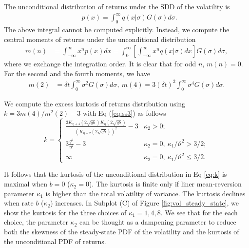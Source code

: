 \documentclass[11pt,a4paper] {article}
\begin{document}
The unconditional distribution of returns under the SDD of the volatility is
\begin{equation}
\begin{split}
& p(x) = \int^{\infty}_{0}  q(x\left.\right|\sigma) G(\sigma)d\sigma.
\end{split}
\end{equation}
The above integral cannot be computed explicitly. Instead, we compute the central moments of returns under the unconditional distribution
\begin{equation}
\begin{split}
m(n) & = \int^{\infty}_{-\infty}x^{n}p(x) dx = \int^{\infty}_{0}  \left[ \int^{\infty}_{-\infty}x^{n} q(x\left.\right|\sigma)dx\right] G(\sigma)d\sigma,
\end{split}
\end{equation}
where we exchange the integration order. It is clear that for odd $n$, $m(n)=0$. For the second and the fourth moments, we have
\begin{equation}
\begin{split}
m(2) & =  \delta t\int^{\infty}_{0} \sigma^{2} G(\sigma)d\sigma, \ m(4) =  3(\delta t)^{2}\int^{\infty}_{0} \sigma^{4} G(\sigma)d\sigma.
\end{split}
\end{equation}


We compute the excess kurtosis of returns distribution using $k=3m(4)/m^{2}(2)-3$ with Eq (\ref{eq:ss3}) as follows
\begin{equation} \label{eq:k}
k= \begin{cases} 
      \frac{3K_{\eta+4}\left(2\sqrt{qb}\right)K_{\eta}\left(2\sqrt{qb}\right)}{\left(K_{\eta+2}\left(2\sqrt{qb}\right)\right)^2} -3 & \kappa_{2}>0; \\
      3\frac{q^{2}}{\eta^{2}} - 3 & \kappa_{2} = 0, \  \kappa_{1}/\vartheta^{2}>3/2; \\
      \infty & \kappa_{2} = 0, \  \kappa_{1}/\vartheta^{2} \leq 3/2.
   \end{cases}
\end{equation}


It follows that the kurtosis of the unconditional distribution in Eq \eqref{eq:k} is maximal when $b=0$ ($\kappa_{2}=0$). The kurtosis is finite only if liner mean-reversion parameter $\kappa_{1}$ is higher than the total volatility of variance. The kurtosis declines when rate $b$ ($\kappa_{2}$) increases. In Subplot (C) of Figure \ref{fig:vol_steady_state}, we show the kurtosis for the three choices of $\kappa_{1}=1, 4, 8$. We see that for the each choice, the parameter $\kappa_2$ can be thought as a dampening parameter to reduce both the skewness of the steady-state PDF of the volatility and the kurtosis of the unconditional PDF of returns.
\end{document}
